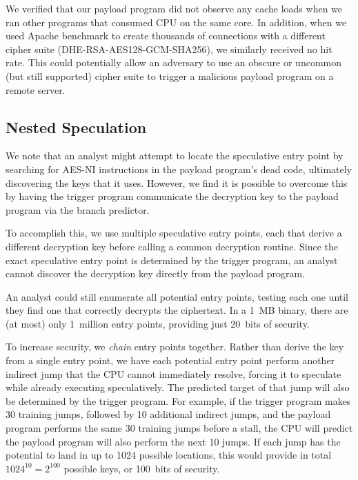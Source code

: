 We verified that our payload program did not observe any cache loads when we ran
other programs that consumed CPU on the same core. In addition, when we used
Apache benchmark to create thousands of connections with a different cipher
suite (DHE-RSA-AES128-GCM-SHA256), we similarly received no hit rate. This
could potentially allow an adversary to use an obscure or uncommon (but still
supported) cipher suite to trigger a malicious payload program on a remote server.

\subsection{Nested Speculation}
\label{subsec:nested-spec}

We note that an analyst might attempt to locate the speculative entry point by
searching for AES-NI instructions in the payload program's dead code, ultimately
discovering the keys that it uses. However, we find it is possible to overcome
this by having the trigger program communicate the decryption key to the payload
program via the branch predictor.

To accomplish this, we use multiple speculative entry points, each that derive a
different decryption key before calling a common decryption routine. Since
the exact speculative entry point is determined by the trigger program, an
analyst cannot discover the decryption key directly from the payload program.

An analyst could still enumerate all potential entry points, testing each one
until they find one that correctly decrypts the ciphertext. In a 1~MB binary,
there are (at most) only 1~million entry points, providing just 20~bits of
security.

To increase security, we \emph{chain} entry points together. Rather than derive
the key from a single entry point, we have each potential entry point perform
another indirect jump that the CPU cannot immediately resolve, forcing it to
speculate while already executing speculatively. The predicted target of that jump
will also be determined by the trigger program. For example, if the trigger
program makes 30 training jumps, followed by 10 additional indirect jumps, and
the payload program performs the same 30 training jumps before a stall, the CPU
will predict the payload program will also perform the next 10 jumps. If each
jump has the potential to land in up to 1024 possible locations, this would
provide in total $1024^{10} = 2^{100}$ possible keys, or 100~bits of security.


